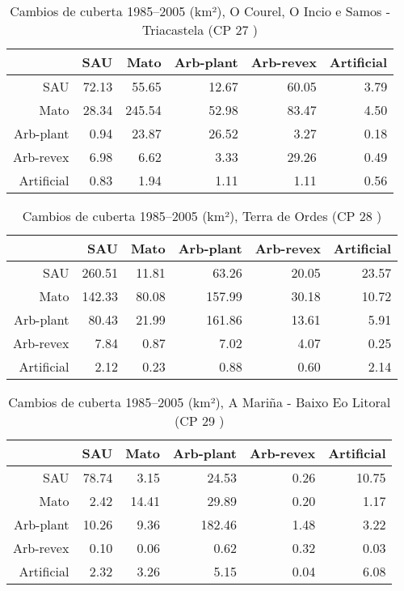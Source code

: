 \begin{table}[p]
\centering
\caption{Cambios de cuberta 1985--2005 (km²), O Courel, O Incio e Samos - Triacastela (CP 27 )} 
\label{TaboaContinxCP27}
\begin{tabular}{rrrrrr}
  \hline
 & SAU & Mato & Arb-plant & Arb-revex & Artificial \\ 
  \hline
SAU & 72.13 & 55.65 & 12.67 & 60.05 & 3.79 \\ 
  Mato & 28.34 & 245.54 & 52.98 & 83.47 & 4.50 \\ 
  Arb-plant & 0.94 & 23.87 & 26.52 & 3.27 & 0.18 \\ 
  Arb-revex & 6.98 & 6.62 & 3.33 & 29.26 & 0.49 \\ 
  Artificial & 0.83 & 1.94 & 1.11 & 1.11 & 0.56 \\ 
   \hline
\end{tabular}
\end{table}
\begin{table}[p]
\centering
\caption{Cambios de cuberta 1985--2005 (km²), Terra de Ordes (CP 28 )} 
\label{TaboaContinxCP28}
\begin{tabular}{rrrrrr}
  \hline
 & SAU & Mato & Arb-plant & Arb-revex & Artificial \\ 
  \hline
SAU & 260.51 & 11.81 & 63.26 & 20.05 & 23.57 \\ 
  Mato & 142.33 & 80.08 & 157.99 & 30.18 & 10.72 \\ 
  Arb-plant & 80.43 & 21.99 & 161.86 & 13.61 & 5.91 \\ 
  Arb-revex & 7.84 & 0.87 & 7.02 & 4.07 & 0.25 \\ 
  Artificial & 2.12 & 0.23 & 0.88 & 0.60 & 2.14 \\ 
   \hline
\end{tabular}
\end{table}
\begin{table}[p]
\centering
\caption{Cambios de cuberta 1985--2005 (km²), A Mariña - Baixo Eo Litoral (CP 29 )} 
\label{TaboaContinxCP29}
\begin{tabular}{rrrrrr}
  \hline
 & SAU & Mato & Arb-plant & Arb-revex & Artificial \\ 
  \hline
SAU & 78.74 & 3.15 & 24.53 & 0.26 & 10.75 \\ 
  Mato & 2.42 & 14.41 & 29.89 & 0.20 & 1.17 \\ 
  Arb-plant & 10.26 & 9.36 & 182.46 & 1.48 & 3.22 \\ 
  Arb-revex & 0.10 & 0.06 & 0.62 & 0.32 & 0.03 \\ 
  Artificial & 2.32 & 3.26 & 5.15 & 0.04 & 6.08 \\ 
   \hline
\end{tabular}
\end{table}
